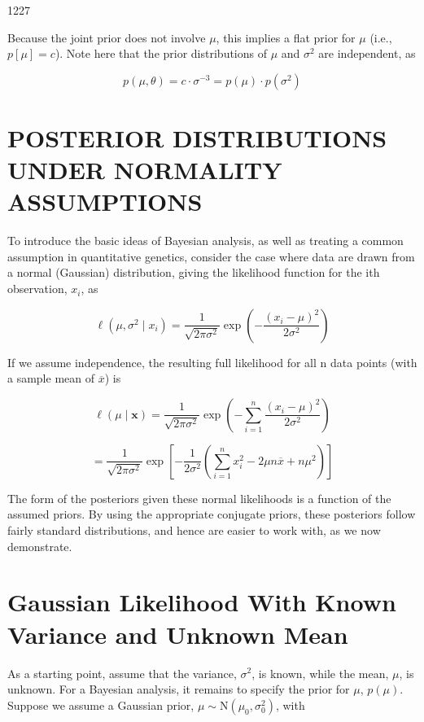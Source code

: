 \documentclass{article}
\begin{document}
1227

Because the joint prior does not involve  $ \mu $, this implies a flat prior for  $ \mu $ (i.e.,  $ p[\mu] = c $). Note here that the prior distributions of  $ \mu $ and  $ \sigma^2 $ are independent, as

\begin{equation}
p(\mu,\theta)=c\cdot\sigma^{-3}=p(\mu)\cdot p(\sigma^{2})
\end{equation}

\section{POSTERIOR DISTRIBUTIONS UNDER NORMALITY ASSUMPTIONS}
To introduce the basic ideas of Bayesian analysis, as well as treating a common assumption in quantitative genetics, consider the case where data are drawn from a normal (Gaussian) distribution, giving the likelihood function for the ith observation,  $ x_{i} $, as

\begin{equation}
\ell(\mu,\sigma^{2}\mid x_{i})=\frac{1}{\sqrt{2\pi\sigma^{2}}}\exp\left(-\frac{(x_{i}-\mu)^{2}}{2\sigma^{2}}\right)
\end{equation}

If we assume independence, the resulting full likelihood for all n data points (with a sample mean of  $ \overline{x} $) is

\begin{equation}
\ell(\mu\mid\mathbf{x})=\frac{1}{\sqrt{2\pi\sigma^{2}}}\exp\left(-\sum_{i=1}^{n}\frac{(x_{i}-\mu)^{2}}{2\sigma^{2}}\right)
\end{equation}

\begin{equation}
=\frac{1}{\sqrt{2\pi\sigma^{2}}}\exp\left[-\frac{1}{2\sigma^{2}}\left(\sum_{i=1}^{n}x_{i}^{2}-2\mu n\overline{x}+n\mu^{2}\right)\right]
\end{equation}

The form of the posteriors given these normal likelihoods is a function of the assumed priors. By using the appropriate conjugate priors, these posteriors follow fairly standard distributions, and hence are easier to work with, as we now demonstrate.

\section{Gaussian Likelihood With Known Variance and Unknown Mean}
As a starting point, assume that the variance,  $ \sigma^2 $, is known, while the mean,  $ \mu $, is unknown. For a Bayesian analysis, it remains to specify the prior for  $ \mu $,  $ p(\mu) $. Suppose we assume a Gaussian prior,  $ \mu \sim \mathrm{N}(\mu_0, \sigma_0^2) $, with
\end{document}
